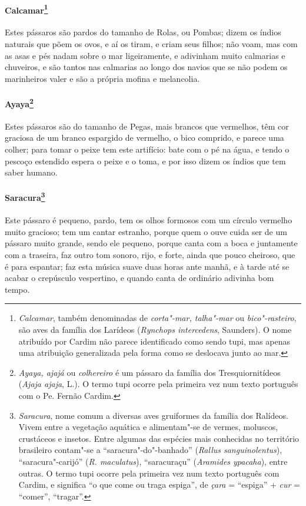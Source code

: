 \paragraph{Calcamar\footnote{ \textit{Calcamar}, também denominadas de
\textit{corta"-mar, talha"-mar} ou \textit{bico"-rasteiro}, são aves da
família dos Larídeos (\textit{Rynchops intercedens}, Saunders). O nome
atribuído por Cardim não parece identificado como sendo tupi, mas
apenas uma atribuição generalizada pela forma como se deslocava junto
ao mar.}} Estes pássaros são pardos do tamanho de Rolas, ou
Pombas; dizem os índios naturais que põem os ovos, e aí os tiram, e
criam seus filhos; não voam, mas com as asas e pés nadam sobre o mar
ligeiramente, e adivinham muito calmarias e chuveiros, e são tantos nas
calmarias ao longo dos navios que se não podem os marinheiros valer e
são a própria mofina e melancolia.

\paragraph{Ayaya\footnote{ \textit{Ayaya, ajajá} ou \textit{colhereiro}
é um pássaro da família dos Tresquiornitídeos (\textit{Ajaja
ajaja}, L.). O termo tupi ocorre pela primeira vez num texto português
com o Pe. Fernão Cardim.}} Estes pássaros são do tamanho de
Pegas, mais brancos que vermelhos, têm cor graciosa de um branco
espargido de vermelho, o bico comprido, e parece uma colher; para tomar
o peixe tem este artifício: bate com o pé na água, e tendo o pescoço
estendido espera o peixe e o toma, e por isso dizem os índios que tem
saber humano.

\paragraph{Saracura\footnote{ \textit{Saracura}, nome comum a diversas
aves gruiformes da família dos Ralídeos. Vivem entre a vegetação
aquática e alimentam"-se de vermes, moluscos, crustáceos e insetos.
Entre algumas das espécies mais conhecidas no território brasileiro
contam"-se a ``saracura"-do"-banhado'' (\textit{Rallus sanguinolentus}), 
``saracura"-carijó'' (\textit{R. maculatus}), ``saracuraçu'' 
(\textit{Aramides ypacaha}), entre outras. O termo tupi ocorre pela
primeira vez num texto português com Cardim, e significa ``o que come
ou traga espiga'', de \textit{çara} = ``espiga'' + \textit{cur} = 
``comer'', ``tragar''.}} Este pássaro é pequeno, pardo, tem os
olhos formosos com um círculo vermelho muito gracioso; tem um cantar
estranho, porque quem o ouve cuida ser de um pássaro muito grande,
sendo ele pequeno, porque canta com a boca e juntamente com a traseira,
faz outro tom sonoro, rijo, e forte, ainda que pouco cheiroso, que é
para espantar; faz esta música suave duas horas ante manhã, e à tarde
até se acabar o crepúsculo vespertino, e quando canta de ordinário
adivinha bom tempo.

